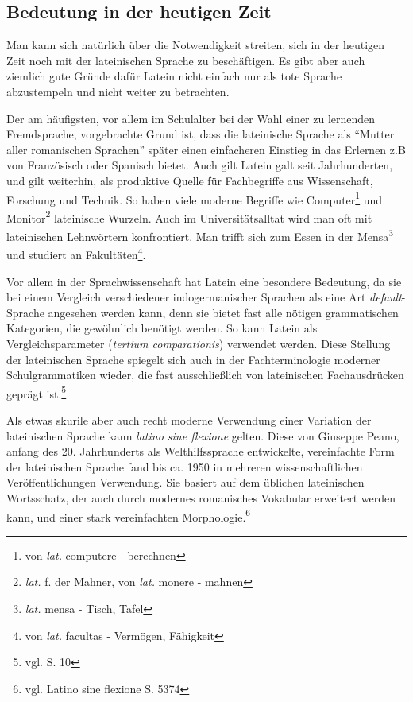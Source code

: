 \documentclass[12pt,abstract=on,titlepage,bibliography=totoc,ngerman,listof=totoc]{scrreprt}
\begin{document}
\subsection{Bedeutung in der heutigen Zeit}
\label{subsec:bedeutung}
Man kann sich natürlich über die Notwendigkeit streiten, sich in der heutigen Zeit noch mit der lateinischen Sprache zu beschäftigen. Es gibt aber auch ziemlich gute Gründe dafür Latein nicht einfach nur als tote Sprache abzustempeln und nicht weiter zu betrachten. \par
Der am häufigsten, vor allem im Schulalter bei der Wahl einer zu lernenden Fremdsprache, vorgebrachte Grund ist, dass die lateinische Sprache als ``Mutter aller romanischen Sprachen'' später einen einfacheren Einstieg in das Erlernen z.B von Französisch oder Spanisch bietet. Auch gilt Latein galt seit Jahrhunderten, und gilt weiterhin, als produktive Quelle für Fachbegriffe aus Wissenschaft, Forschung und Technik. So haben viele moderne Begriffe wie Computer\footnote{von \textit{lat.} computere - berechnen} und Monitor\footnote{\textit{lat.} f. der Mahner, von \textit{lat.} monere - mahnen} lateinische Wurzeln. Auch im Universitätsalltat wird man oft mit lateinischen Lehnwörtern konfrontiert. Man trifft sich zum Essen in der Mensa\footnote{\textit{lat.} mensa - Tisch, Tafel} und studiert an Fakultäten\footnote{von \textit{lat.} facultas - Vermögen, Fähigkeit}. \par
Vor allem in der Sprachwissenschaft hat Latein eine besondere Bedeutung, da sie bei einem Vergleich verschiedener indogermanischer Sprachen als eine Art \textit{default}-Sprache angesehen werden kann, denn sie bietet fast alle nötigen grammatischen Kategorien, die gewöhnlich benötigt werden. So kann Latein als Vergleichsparameter (\textit{tertium comparationis}) verwendet werden. Diese Stellung der lateinischen Sprache spiegelt sich auch in der Fachterminologie moderner Schulgrammatiken wieder, die fast ausschließlich von lateinischen Fachausdrücken geprägt ist.\footnote{vgl. \cite{MUELLER-LANCE2006} S. 10} \par
Als etwas skurile aber auch recht moderne Verwendung einer Variation der lateinischen Sprache kann \textit{latino sine flexione} gelten. Diese von Giuseppe Peano, anfang des 20. Jahrhunderts als Welthilfssprache entwickelte, vereinfachte Form der lateinischen Sprache fand bis ca. 1950 in mehreren wissenschaftlichen Veröffentlichungen Verwendung. Sie basiert auf dem üblichen lateinischen Wortsschatz, der auch durch modernes romanisches Vokabular erweitert werden kann, und einer stark vereinfachten Morphologie.\footnote{vgl. \cite{METZLER2004} Latino sine flexione S. 5374}
\pagebreak
\end{document}
